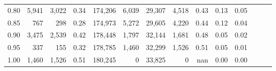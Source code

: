 \begin{tabular}{rrrrrrrrrrrrrr}
0.80 &   5,941 &  3,022 &  0.34 &  174,206 &    6,039 &  29,307 &   4,518 &  0.43 &  0.13 &      0.05 \\
0.85 &     767 &    298 &  0.28 &  174,973 &    5,272 &  29,605 &   4,220 &  0.44 &  0.12 &      0.04 \\
0.90 &   3,475 &  2,539 &  0.42 &  178,448 &    1,797 &  32,144 &   1,681 &  0.48 &  0.05 &      0.02 \\
0.95 &     337 &    155 &  0.32 &  178,785 &    1,460 &  32,299 &   1,526 &  0.51 &  0.05 &      0.01 \\
1.00 &   1,460 &  1,526 &  0.51 &  180,245 &        0 &  33,825 &       0 &   nan &  0.00 &      0.00 \\
\bottomrule
\end{tabular}
